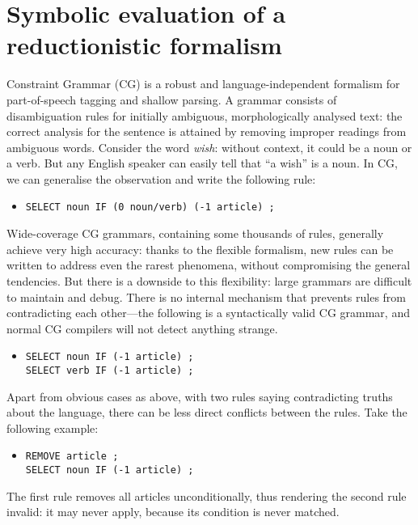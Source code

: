 \section{Symbolic evaluation of a reductionistic formalism}

Constraint Grammar (CG) \cite{karlsson1995constraint} is a robust and
language-independent formalism for part-of-speech tagging and shallow
parsing. A grammar consists of disambiguation rules for initially
ambiguous, morphologically analysed text: the correct analysis for the
sentence is attained by removing improper readings from ambiguous
words. Consider the word \emph{wish}: without context, it could be a
noun or a verb. But any English speaker can easily tell that ``a
wish'' is a noun. In CG, we can generalise the observation and write
the following rule:

\begin{itemize}
\item[] \texttt{SELECT noun IF (0 noun/verb) (-1 article) ;}
\end{itemize}

Wide-coverage CG grammars, containing some thousands of rules,
generally achieve very high accuracy:
thanks to the flexible formalism, new rules can be written
to address even the rarest phenomena, without compromising the general tendencies.
But there is a downside to this flexibility: large grammars are difficult to maintain
and debug. There is no internal mechanism that prevents rules from contradicting
each other---the following is a syntactically valid CG grammar, and normal CG compilers will not detect anything strange.

\begin{itemize}
\item[] \texttt{SELECT noun IF (-1 article) ;} \\ \texttt{SELECT verb IF (-1 article) ;}
\end{itemize}

Apart from obvious cases as above, with two rules saying contradicting truths about the language, there can be less direct conflicts between the rules. Take the following example:

\begin{itemize}
\item[] \texttt{REMOVE article ;} \\ \texttt{SELECT noun IF (-1 article) ;}
\end{itemize}

\noindent The first rule removes all articles unconditionally, thus rendering the second rule invalid: it may never apply, because its condition is never matched.

